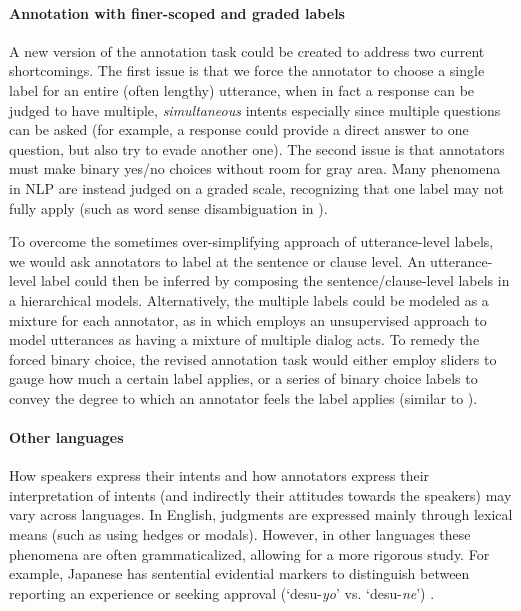 \paragraph{Annotation with finer-scoped and graded labels}
A new version of the annotation task could be created to address two current shortcomings. The first issue is that we force the annotator to choose a single label for an entire (often lengthy) utterance, when in fact a response can be judged to have multiple, \emph{simultaneous} intents especially since multiple questions can be asked (for example, a response could provide a direct answer to one question, but also try to evade another one). The second issue is that annotators must make binary yes/no choices without room for gray area. Many phenomena in NLP are instead judged on a graded scale, recognizing that one label may not fully apply (such as word sense disambiguation in ).

To overcome the sometimes over-simplifying approach of utterance-level labels, we would ask annotators to label at the sentence or clause level. An utterance-level label could then be inferred by composing the sentence/clause-level labels in a hierarchical models. Alternatively, the multiple labels could be modeled as a mixture for each annotator, as in  which employs an unsupervised approach to model utterances as having a mixture of multiple dialog acts. To remedy the forced binary choice, the revised annotation task would either employ sliders to gauge how much a certain label applies, or a series of binary choice labels to convey the degree to which an annotator feels the label applies (similar to ). 

\paragraph{Other languages}
How speakers express their intents and how annotators express their interpretation of intents (and indirectly their attitudes towards the speakers) may vary across languages. In English, judgments are expressed mainly through lexical means (such as using hedges or modals). However, in other languages these phenomena are often grammaticalized, allowing for a more rigorous study. For example, Japanese has sentential evidential markers to distinguish between reporting an experience or seeking approval (`desu-\textit{yo}' vs. `desu-\textit{ne}') \cite{Stojanovic:2019}. %

